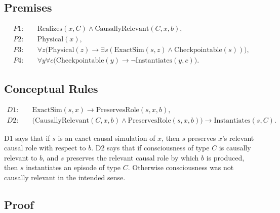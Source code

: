 \documentclass[11pt]{article}
\begin{document}
\subsection*{Premises}

\begin{align*}
  P1:\quad & \mathrm{Realizes}(x,C)\land \mathrm{CausallyRelevant}(C,x,b), \\
  P2:\quad & \mathrm{Physical}(x),                                         \\
  P3:\quad & \forall z\bigl(\mathrm{Physical}(z)\to
  \exists s(\mathrm{ExactSim}(s,z)\land \mathrm{Checkpointable}(s))\bigr), \\
  P4:\quad & \forall y\forall c\bigl(\mathrm{Checkpointable}(y)\to
  \neg \mathrm{Instantiates}(y,c)\bigr).
\end{align*}

\subsection*{Conceptual Rules}

\begin{align*}
  D1:\quad & \mathrm{ExactSim}(s,x)\to \mathrm{PreservesRole}(s,x,b), \\
  D2:\quad & \bigl(\mathrm{CausallyRelevant}(C,x,b)\land
  \mathrm{PreservesRole}(s,x,b)\bigr)\to \mathrm{Instantiates}(s,C).
\end{align*}

\noindent
D1 says that if \(s\) is an exact causal simulation of \(x\), then \(s\)
preserves \(x\)'s relevant causal role with respect to \(b\). D2 says that if
consciousness of type \(C\) is causally relevant to \(b\), and \(s\) preserves
the relevant causal role by which \(b\) is produced, then \(s\) instantiates an
episode of type \(C\). Otherwise consciousness was not causally relevant in the
intended sense.

\subsection*{Proof}
\end{document}
